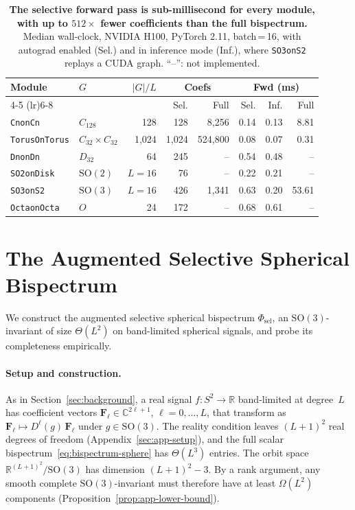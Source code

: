 \documentclass{article}
\theoremstyle{definition}
\theoremstyle{remark}
\newcommand{\R}{\mathbb{R}}
\newcommand{\C}{\mathbb{C}}
\newcommand{\SO}{\mathrm{SO}}
\theoremstyle{definition}
\begin{document}
\begin{table}[tbp]
  \centering
  \caption{\textbf{The selective forward pass is sub-millisecond for every module, with up to
    $512\times$ fewer coefficients than the full bispectrum.}
    Median wall-clock, NVIDIA H100, PyTorch 2.11, batch\,=\,16, with autograd
    enabled (Sel.) and in inference mode (Inf.), where \texttt{SO3onS2} replays a
    CUDA graph. ``--'': not implemented.}
  \label{tab:benchmarks}
  \small
  \setlength{\tabcolsep}{3.5pt}
  \begin{tabular*}{\linewidth}{@{\extracolsep{\fill}}llrrrrrr@{}}
    \toprule
    Module & $G$ & $|G|/L$ & \multicolumn{2}{c}{Coefs} & \multicolumn{3}{c}{Fwd (ms)} \\
    \cmidrule(lr){4-5} \cmidrule(lr){6-8}
     & & & Sel. & Full & Sel. & Inf. & Full \\
    \midrule
    \texttt{CnonCn} & $C_{128}$ & 128 & 128 & 8{,}256 & 0.14 & 0.13 & 8.81 \\
    \texttt{TorusOnTorus} & $C_{32}{\times}C_{32}$ & 1{,}024 & 1{,}024 & 524{,}800 & 0.08 & 0.07 & 0.31 \\
    \texttt{DnonDn} & $D_{32}$ & 64 & 245 & -- & 0.54 & 0.48 & -- \\
    \texttt{SO2onDisk} & $\mathrm{SO}(2)$ & $L{=}16$ & 76 & -- & 0.22 & 0.21 & -- \\
    \texttt{SO3onS2} & $\mathrm{SO}(3)$ & $L{=}16$ & 426 & 1{,}341 & 0.63 & 0.20 & 53.61 \\
    \texttt{OctaonOcta} & $O$ & 24 & 172 & -- & 0.68 & 0.61 & -- \\
    \bottomrule
  \end{tabular*}
\end{table}



\section{The Augmented Selective Spherical Bispectrum}
\label{sec:so3-selective}

We construct the augmented selective spherical bispectrum
$\Phi_{\mathrm{sel}}$, an
$\SO(3)$-invariant of size $\Theta(L^2)$ on band-limited spherical
signals, and probe its completeness empirically.

\paragraph{Setup and construction.} As in Section~\ref{sec:background}, a real signal
$f : S^2 \to \R$ band-limited at degree~$L$ has coefficient vectors
$\mathbf{F}_\ell \in \C^{2\ell+1}$, $\ell=0,\dots,L$, that transform as
$\mathbf{F}_\ell \mapsto D^\ell(g)\,\mathbf{F}_\ell$ under $g\in\SO(3)$. The reality
condition leaves $(L{+}1)^2$ real degrees of freedom (Appendix~\ref{sec:app-setup}), and the
full scalar bispectrum~\eqref{eq:bispectrum-sphere} has $\Theta(L^3)$ entries. The orbit space
$\R^{(L+1)^2}/\SO(3)$ has dimension $(L{+}1)^2 - 3$. By a rank
argument, any smooth complete $\SO(3)$-invariant must therefore have
at least $\Omega(L^2)$ components
(Proposition~\ref{prop:app-lower-bound}). 
\end{document}
